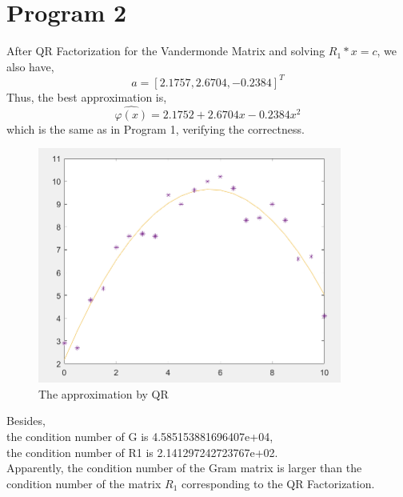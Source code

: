 \documentclass[11pt,a4paper]{article}
\theoremstyle{plain}
\begin{document}
\section*{Program 2}
After QR Factorization for the Vandermonde Matrix and solving $R_1*x = c$, we also have,
\begin{equation}
    a = [2.1757 , 2.6704, -0.2384]^T
\end{equation}
Thus, the best approximation is,
\begin{equation}
    \hat{\varphi(x)} = 2.1752 + 2.6704x - 0.2384x^2
\end{equation}
\indent which is the same as in Program 1, verifying the correctness.\\
\begin{figure}[H]
    \centering
    \includegraphics[width=10cm]{2.png}
    \caption{The approximation by QR}
    \label{fig:1L}
\end{figure}
\noindent Besides,\\
the condition number of G is 4.585153881696407e+04,\\
the condition number of R1 is 2.141297242723767e+02.\\
\indent Apparently, the condition number of the Gram matrix is larger than the condition number of the matrix $R_1$ corresponding to the QR Factorization.
\end{document}
